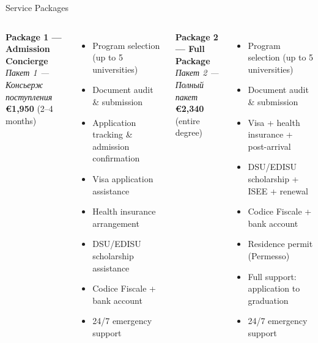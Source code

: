 \documentclass[aspectratio=169]{beamer}
\newcommand{\ru}[1]{{\textit{#1}}}
\newcommand{\biframe}[2]{\begin{frame}{#1}\noindent{\scriptsize\textit{#2}}\vspace{0.2em}}
\begin{document}
\biframe{Service Packages}{Пакеты услуг}
\scriptsize
\begin{columns}[T]
\textbf{Package 1 — Admission Concierge}\\[0.1em]
\ru{Пакет 1 — Консьерж поступления}\\[0.2em]
\textbf{\large €1,950} \quad\small(2–4 months)

\vspace{0.15em}
\begin{itemize}\setlength{\itemsep}{0pt}
  \item[\checkmark] Program selection (up to 5 universities)
  \item[\checkmark] Document audit \& submission
  \item[\checkmark] Application tracking \& admission confirmation
  \item[\checkmark] Visa application assistance
  \item[\checkmark] Health insurance arrangement
  \item[\checkmark] DSU/EDISU scholarship assistance
  \item[\checkmark] Codice Fiscale + bank account
  \item[\checkmark] 24/7 emergency support
\end{itemize}

\textbf{Package 2 — Full Package}\\[0.1em]
\ru{Пакет 2 — Полный пакет}\\[0.2em]
\textbf{\large €2,340} \quad\small(entire degree)

\vspace{0.15em}
\begin{itemize}\setlength{\itemsep}{0pt}
  \item[\checkmark] Program selection (up to 5 universities)
  \item[\checkmark] Document audit \& submission
  \item[\checkmark] Visa + health insurance + post-arrival
  \item[\checkmark] DSU/EDISU scholarship + ISEE + renewal
  \item[\checkmark] Codice Fiscale + bank account
  \item[\checkmark] Residence permit (Permesso)
  \item[\checkmark] Full support: application to graduation
  \item[\checkmark] 24/7 emergency support
\end{itemize}
\end{columns}
\end{frame}
\end{document}
